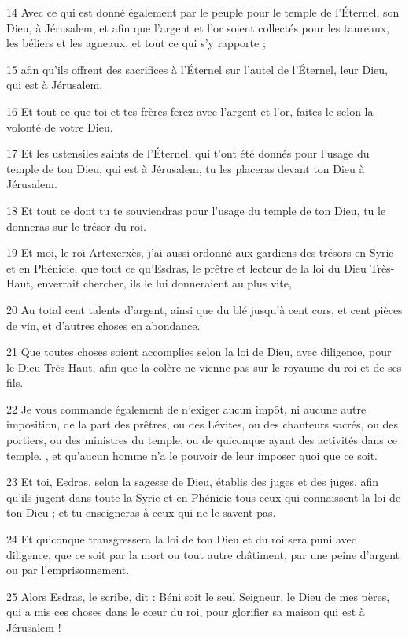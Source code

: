 \par 14 Avec ce qui est donné également par le peuple pour le temple de l'Éternel, son Dieu, à Jérusalem, et afin que l'argent et l'or soient collectés pour les taureaux, les béliers et les agneaux, et tout ce qui s'y rapporte ;
\par 15 afin qu'ils offrent des sacrifices à l'Éternel sur l'autel de l'Éternel, leur Dieu, qui est à Jérusalem.
\par 16 Et tout ce que toi et tes frères ferez avec l'argent et l'or, faites-le selon la volonté de votre Dieu.
\par 17 Et les ustensiles saints de l'Éternel, qui t'ont été donnés pour l'usage du temple de ton Dieu, qui est à Jérusalem, tu les placeras devant ton Dieu à Jérusalem.
\par 18 Et tout ce dont tu te souviendras pour l'usage du temple de ton Dieu, tu le donneras sur le trésor du roi.
\par 19 Et moi, le roi Artexerxès, j'ai aussi ordonné aux gardiens des trésors en Syrie et en Phénicie, que tout ce qu'Esdras, le prêtre et lecteur de la loi du Dieu Très-Haut, enverrait chercher, ils le lui donneraient au plus vite,
\par 20 Au total cent talents d'argent, ainsi que du blé jusqu'à cent cors, et cent pièces de vin, et d'autres choses en abondance.
\par 21 Que toutes choses soient accomplies selon la loi de Dieu, avec diligence, pour le Dieu Très-Haut, afin que la colère ne vienne pas sur le royaume du roi et de ses fils.
\par 22 Je vous commande également de n'exiger aucun impôt, ni aucune autre imposition, de la part des prêtres, ou des Lévites, ou des chanteurs sacrés, ou des portiers, ou des ministres du temple, ou de quiconque ayant des activités dans ce temple. , et qu'aucun homme n'a le pouvoir de leur imposer quoi que ce soit.
\par 23 Et toi, Esdras, selon la sagesse de Dieu, établis des juges et des juges, afin qu'ils jugent dans toute la Syrie et en Phénicie tous ceux qui connaissent la loi de ton Dieu ; et tu enseigneras à ceux qui ne le savent pas.
\par 24 Et quiconque transgressera la loi de ton Dieu et du roi sera puni avec diligence, que ce soit par la mort ou tout autre châtiment, par une peine d'argent ou par l'emprisonnement.
\par 25 Alors Esdras, le scribe, dit : Béni soit le seul Seigneur, le Dieu de mes pères, qui a mis ces choses dans le cœur du roi, pour glorifier sa maison qui est à Jérusalem !
